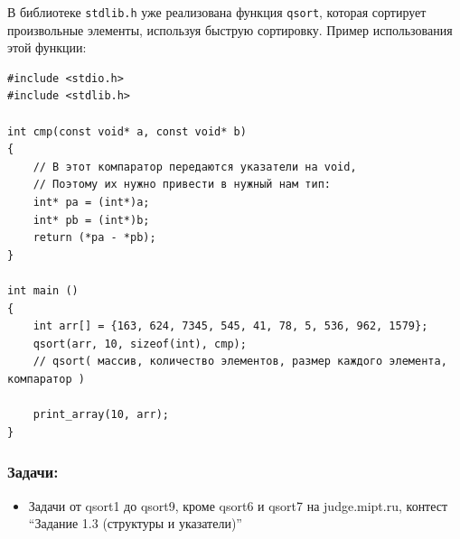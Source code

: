 \documentclass{article}
\begin{document}
В библиотеке \texttt{stdlib.h} уже реализована функция \texttt{qsort}, которая сортирует произвольные элементы, используя быструю сортировку. Пример использования этой функции:
\begin{lstlisting}
#include <stdio.h>
#include <stdlib.h>

int cmp(const void* a, const void* b)
{
    // В этот компаратор передаются указатели на void,
    // Поэтому их нужно привести в нужный нам тип:
    int* pa = (int*)a;
    int* pb = (int*)b;
    return (*pa - *pb);
}

int main ()
{
    int arr[] = {163, 624, 7345, 545, 41, 78, 5, 536, 962, 1579};
    qsort(arr, 10, sizeof(int), cmp);
    // qsort( массив, количество элементов, размер каждого элемента, компаратор )
   
    print_array(10, arr);
}
\end{lstlisting}
\subsubsection*{Задачи:}
\begin{itemize}
\item Задачи от qsort1 до qsort9, кроме qsort6 и qsort7 на judge.mipt.ru, контест ``Задание 1.3 (структуры и указатели)''
\end{itemize}
\end{document}
